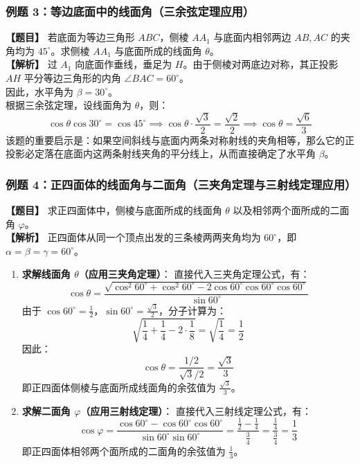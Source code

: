 \documentclass[11pt,a4paper]{ctexart}
\begin{document}
\subsubsection{例题 3：等边底面中的线面角（三余弦定理应用）}
\textbf{【题目】} 若底面为等边三角形 $ABC$，侧棱 $AA_1$ 与底面内相邻两边 $AB, AC$ 的夹角均为 $45^\circ$。求侧棱 $AA_1$ 与底面所成的线面角 $\theta$。\\
\textbf{【解析】} 过 $A_1$ 向底面作垂线，垂足为 $H$。由于侧棱对两底边对称，其正投影 $AH$ 平分等边三角形的内角 $\angle BAC = 60^\circ$。\\
因此，水平角为 $\beta = 30^\circ$。\\
根据三余弦定理，设线面角为 $\theta$，则：
\[ \cos\theta \cos 30^\circ = \cos 45^\circ \implies \cos\theta \cdot \frac{\sqrt{3}}{2} = \frac{\sqrt{2}}{2} \implies \cos\theta = \frac{\sqrt{6}}{3} \]
该题的重要启示是：如果空间斜线与底面内两条对称射线的夹角相等，那么它的正投影必定落在底面内这两条射线夹角的平分线上，从而直接确定了水平角 $\beta$。

\subsubsection{例题 4：正四面体的线面角与二面角（三夹角定理与三射线定理应用）}
\textbf{【题目】} 求正四面体中，侧棱与底面所成的线面角 $\theta$ 以及相邻两个面所成的二面角 $\varphi$。\\
\textbf{【解析】} 正四面体从同一个顶点出发的三条棱两两夹角均为 $60^\circ$，即 $\alpha = \beta = \gamma = 60^\circ$。
\begin{enumerate}
    \item \textbf{求解线面角 $\theta$（应用三夹角定理）}：
    直接代入三夹角定理公式，有：
    \[ \cos\theta = \frac{\sqrt{\cos^2 60^\circ + \cos^2 60^\circ - 2\cos 60^\circ \cos 60^\circ \cos 60^\circ}}{\sin 60^\circ} \]
    由于 $\cos 60^\circ = \frac{1}{2}$，$\sin 60^\circ = \frac{\sqrt{3}}{2}$，分子计算为：
    \[ \sqrt{\frac{1}{4} + \frac{1}{4} - 2 \cdot \frac{1}{8}} = \sqrt{\frac{1}{4}} = \frac{1}{2} \]
    因此：
    \[ \cos\theta = \frac{1/2}{\sqrt{3}/2} = \frac{\sqrt{3}}{3} \]
    即正四面体侧棱与底面所成线面角的余弦值为 $\frac{\sqrt{3}}{3}$。
    
    \item \textbf{求解二面角 $\varphi$（应用三射线定理）}：
    直接代入三射线定理公式，有：
    \[ \cos\varphi = \frac{\cos 60^\circ - \cos 60^\circ \cos 60^\circ}{\sin 60^\circ \sin 60^\circ} = \frac{\frac{1}{2} - \frac{1}{4}}{\frac{3}{4}} = \frac{\frac{1}{4}}{\frac{3}{4}} = \frac{1}{3} \]
    即正四面体相邻两个面所成的二面角的余弦值为 $\frac{1}{3}$。
\end{enumerate}
\end{document}
